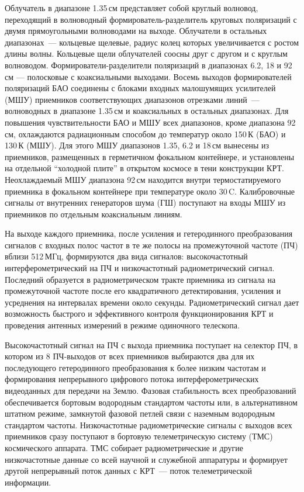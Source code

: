 Облучатель в диапазоне 1.35\,см представляет
собой круглый волновод, переходящий в волноводный формирователь-разделитель круговых поляризаций с
двумя прямоугольными волноводами
на выходе. Облучатели в остальных диапазонах~---
кольцевые щелевые, радиус колец которых увеличивается с ростом длины волны. Кольцевые щели
облучателей соосны друг с другом и с круглым
волноводом. Формирователи-разделители поляризаций в диапазонах 6.2, 18 и 92\,см --- полосковые
с коаксиальными выходами. Восемь выходов формирователей поляризаций БАО соединены с блоками входных
малошумящих усилителей (МШУ)
приемников соответствующих диапазонов отрезками линий~--- волноводных в диапазоне
1.35\,см и коаксиальных в остальных диапазонах. Для повышения чувствительности БАО и МШУ всех
диапазонов, кроме диапазона 92\,см, охлаждаются радиационным способом до температур около 150\,К
(БАО) и 130\,К (МШУ). Для этого МШУ диапазонов 1.35, 6.2 и 18\,см вынесены из приемников,
размещенных в герметичном фокальном контейнере, и установлены на отдельной ``холодной плите'' в
открытом космосе в тени конструкции КРТ. Неохлаждаемый МШУ диапазона 92\,см находится
внутри термостатируемого приемника в фокальном
контейнере при температуре около 30\textdegree\,C. Калибровочные сигналы от внутренних генераторов
шума (ГШ) поступают на входы МШУ из приемников по
отдельным коаксиальным линиям.

На выходе каждого приемника, после усиления
и гетеродинного преобразования сигналов с входных полос частот в те же полосы на промежуточной
частоте (ПЧ) вблизи 512\,МГц, формируются два
вида сигналов: высокочастотный интерферометрический на ПЧ и низкочастотный радиометрический
сигнал. Последний образуется в радиометрическом тракте приемника из сигнала на промежуточной частоте
после его квадратичного детектирования, усиления и усреднения на интервалах времени около секунды.
Радиометрический сигнал дает
возможность быстрого и эффективного контроля
функционирования КРТ и проведения антенных
измерений в режиме одиночного телескопа.

Высокочастотный сигнал на ПЧ с выхода приемника поступает на селектор ПЧ, в котором из
8 ПЧ-выходов от всех приемников выбираются
два для их последующего гетеродинного преобразования к более низким частотам и формирования
непрерывного цифрового потока интерферометрических видеоданных для передачи на Землю. Фазовая
стабильность всех преобразований обеспечивается бортовым водородным стандартом частоты
или, в альтернативном штатном режиме, замкнутой фазовой петлей связи с наземным водородным
стандартом частоты. Низкочастотные радиометрические сигналы с выходов всех приемников сразу
поступают в бортовую телеметрическую систему
(ТМС) космического аппарата. ТМС собирает радиометрические и другие низкочастотные данные
со всей научной и служебной аппаратуры и формирует другой непрерывный поток данных с КРТ~--- поток
телеметрической информации.

